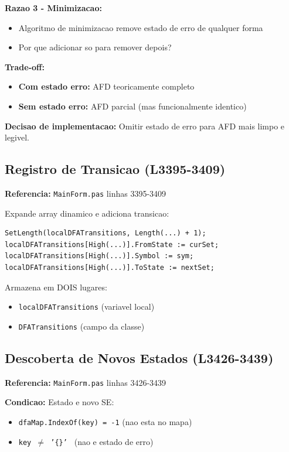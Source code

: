 \documentclass[12pt,a4paper]{article}
\begin{document}
\textbf{Razao 3 - Minimizacao:}
\begin{itemize}
    \item Algoritmo de minimizacao remove estado de erro de qualquer forma
    \item Por que adicionar so para remover depois?
\end{itemize}

\textbf{Trade-off:}
\begin{itemize}
    \item \textbf{Com estado erro:} AFD teoricamente completo
    \item \textbf{Sem estado erro:} AFD parcial (mas funcionalmente identico)
\end{itemize}

\textbf{Decisao de implementacao:} Omitir estado de erro para AFD mais limpo e legivel.

\subsection{Registro de Transicao (L3395-3409)}

\textbf{Referencia:} \texttt{MainForm.pas} linhas 3395-3409

Expande array dinamico e adiciona transicao:

\begin{lstlisting}[style=pascal]
SetLength(localDFATransitions, Length(...) + 1);
localDFATransitions[High(...)].FromState := curSet;
localDFATransitions[High(...)].Symbol := sym;
localDFATransitions[High(...)].ToState := nextSet;
\end{lstlisting}

Armazena em DOIS lugares:
\begin{itemize}
    \item \texttt{localDFATransitions} (variavel local)
    \item \texttt{DFATransitions} (campo da classe)
\end{itemize}

\subsection{Descoberta de Novos Estados (L3426-3439)}

\textbf{Referencia:} \texttt{MainForm.pas} linhas 3426-3439

\textbf{Condicao:} Estado e novo SE:
\begin{itemize}
    \item \texttt{dfaMap.IndexOf(key) = -1} (nao esta no mapa)
    \item \texttt{key $\neq$ '\{\}' } (nao e estado de erro)
\end{itemize}
\end{document}
